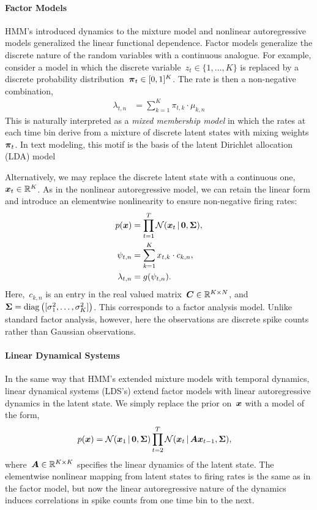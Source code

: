 \paragraph{Factor Models}
HMM's introduced dynamics to the mixture model and nonlinear
autoregressive models generalized the linear functional dependence.
Factor models generalize the discrete nature of the random variables
with a continuous analogue. For example, consider a model in which the
discrete variable~${z_t \in \{1, \ldots, K\}}$ is replaced by a
discrete probability distribution~${\boldsymbol{\pi}_t \in [0,1]^K}$. The rate
is then a non-negative combination,
\begin{align*}
  \lambda_{t,n} &= \sum_{k=1}^K \pi_{t,k} \cdot \mu_{k,n}
\end{align*}
This is naturally interpreted as a \emph{mixed membership model} in
which the rates at each time bin derive from a mixture of discrete
latent states with mixing weights~$\boldsymbol{\pi}_t$. In text modeling, this motif
is the basis of the latent Dirichlet allocation (LDA)
model~\citep{blei2003latent}

Alternatively, we may replace the discrete latent state with a continuous
one,~$\boldsymbol{x}_t \in \mathbb{R}^K$. As in the nonlinear autoregressive model,
we can retain the linear form and introduce an elementwise nonlinearity
to ensure non-negative firing rates:
\begin{align*}
  p(\boldsymbol{x}) &= \prod_{t=1}^T \mathcal{N}(\boldsymbol{x}_t \,|\, \boldsymbol{0}, \boldsymbol{\Sigma}), \\
  \psi_{t,n} &= \sum_{k=1}^K x_{t,k} \cdot c_{k,n}, \\
  \lambda_{t,n} &= g(\psi_{t,n}).
\end{align*}
Here,~$c_{k,n}$ is an entry in the real valued matrix~$\boldsymbol{C} \in
\mathbb{R}^{K \times N}$, and~${\boldsymbol{\Sigma} = \mathrm{diag} \left([ \sigma^2_1,
    \ldots, \sigma^2_K ] \right)}$.  This corresponds to a factor
analysis model. Unlike standard factor analysis, however, here the
observations are discrete spike counts rather than Gaussian
observations.

\paragraph{Linear Dynamical Systems}
In the same way that HMM's extended mixture models with temporal
dynamics, linear dynamical systems (LDS's) extend factor models with
linear autoregressive dynamics in the latent state.  We simply replace
the prior on~$\boldsymbol{x}$ with a model of the form,
\begin{align*}
  p(\boldsymbol{x}) &= \mathcal{N}(\boldsymbol{x}_1 \,|\, \boldsymbol{0}, \boldsymbol{\Sigma}) \prod_{t=2}^T \mathcal{N}(\boldsymbol{x}_t \,|\, \boldsymbol{A} \boldsymbol{x}_{t-1}, \boldsymbol{\Sigma}),
\end{align*}
where~$\boldsymbol{A} \in \mathbb{R}^{K \times K}$ specifies the linear dynamics of
the latent state.  The elementwise nonlinear mapping from latent
states to firing rates is the same as in the factor model, but now the
linear autoregressive nature of the dynamics induces correlations in
spike counts from one time bin to the next.


